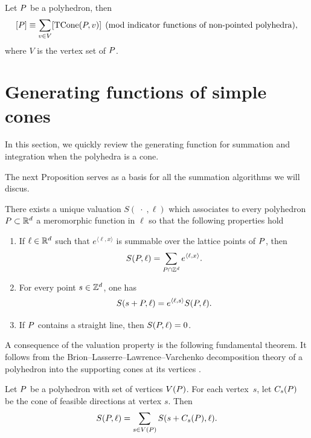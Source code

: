 \begin{cor}
\label{cor:tcone-mod-lines}
Let ${ P}$ be a polyhedron, then 
\[ [{ P}] \equiv \sum_{v \in V} [\operatorname{TCone}({ P}, v)] \pmod{\text{indicator functions of non-pointed polyhedra}},\]
where $V$ is the vertex set of ${ P}$.
\end{cor}

\section{Generating functions of simple cones}

In this section, we quickly review the generating function for summation and integration when the polyhedra is a cone. 
 
The next Proposition serves as a basis for all the summation algorithms we will discus. 

\begin{proposition}\label{valuationI}
There exists a unique valuation  $S(\;\cdot\;,\ell)$ which  associates  to every polyhedron
${ P}\subset {\mathbb R}^d$ a meromorphic function in $\ell$ so that the following properties hold 

\begin{enumerate}
\item If $\ell \in {\mathbb R}^d$ such that $e^{\langle \ell, x\rangle}$ is summable over the lattice points of ${ P}$, then
$$
S({ P},\ell)= \sum_{{ P} \cap {\mathbb Z}^d} e^{\langle \ell,x\rangle}.
$$

\item For every point $s \in {\mathbb Z}^d$, one has
$$
S(s+{ P},\ell) = e^{\langle \ell,s\rangle}S({ P},\ell).
$$
\item If ${ P}$ contains a straight line, then $S({ P},\ell)=0$.
\end{enumerate}
\end{proposition}


A consequence of the valuation property is the following fundamental theorem. 
It follows from the Brion--Lasserre--Lawrence--Varchenko decomposition theory of a
polyhedron into the supporting cones at its vertices \cite{beck-haase-sottile:theorema, Brion88,barvinokzurichbook, lasserre-volume1983}.


\begin{lemma} \label{brion-exp} Let ${ P}$ be a polyhedron with set of vertices $V({ P})$. For each
vertex~$s$, let $C_s({ P})$ be the cone of feasible directions at vertex $s$. Then
\begin{equation*}
S({ P},\ell)=\sum_{s\in V({ P})}S(s+C_s({ P}),\ell).
\end{equation*}
\end{lemma}

